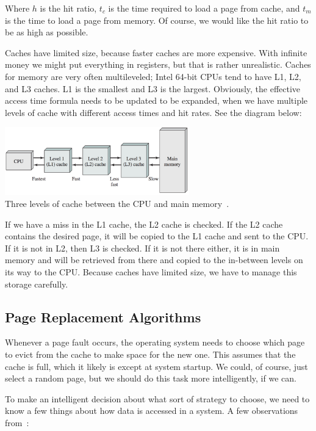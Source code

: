 Where $h$ is the hit ratio, $t_{c}$ is the time required to load a page from cache, and $t_{m}$ is the time to load a page from memory. Of course, we would like the hit ratio to be as high as possible. 

Caches have limited size, because faster caches are more expensive. With infinite money we might put everything in registers, but that is rather unrealistic. Caches for memory are very often multileveled; Intel 64-bit CPUs tend to have L1, L2, and L3 caches. L1 is the smallest and L3 is the largest. Obviously, the effective access time formula needs to be updated to be expanded, when we have multiple levels of cache with different access times and hit rates. See the diagram below:

\begin{center}
\includegraphics[width=0.6\textwidth]{images/caches.png}\\
Three levels of cache between the CPU and main memory~\cite{osi}.
\end{center}

If we have a miss in the L1 cache, the L2 cache is checked. If the L2 cache contains the desired page, it will be copied to the L1 cache and sent to the CPU. If it is not in L2, then L3 is checked. If it is not there either, it is in main memory and will be retrieved from there and copied to the in-between levels on its way to the CPU. Because caches have limited size, we have to manage this storage carefully.

\subsection*{Page Replacement Algorithms}
Whenever a page fault occurs, the operating system needs to choose which page to evict from the cache to make space for the new one. This assumes that the cache is full, which it likely is except at system startup. We could, of course, just select a random page, but we should do this task more intelligently, if we can.

To make an intelligent decision about what sort of strategy to choose, we need to know a few things about how data is accessed in a system. A few observations from~\cite{mte241}:


